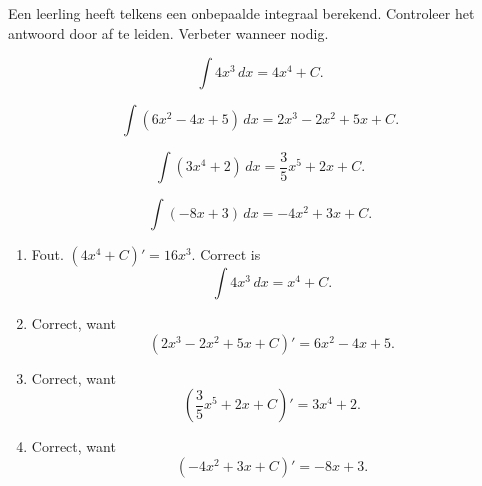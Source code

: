 \documentclass{ximera}
\begin{document}
\begin{oefening}{\oefB\ESS}

Een leerling heeft telkens een onbepaalde integraal berekend. Controleer het antwoord door af te leiden. Verbeter wanneer nodig.

\begin{question}
\[
\int 4x^3\,dx=4x^4+C.
\]
\end{question}

\begin{question}
\[
\int (6x^2-4x+5)\,dx=2x^3-2x^2+5x+C.
\]
\end{question}

\begin{question}
\[
\int (3x^4+2)\,dx=\frac35x^5+2x+C.
\]
\end{question}

\begin{question}
\[
\int (-8x+3)\,dx=-4x^2+3x+C.
\]
\end{question}

\begin{oplossing}

\begin{enumerate}
\item Fout. $(4x^4+C)'=16x^3$. Correct is
\[
\boxed{\int 4x^3\,dx=x^4+C}.
\]

\item Correct, want
\[
(2x^3-2x^2+5x+C)'=6x^2-4x+5.
\]

\item Correct, want
\[
\left(\frac35x^5+2x+C\right)'=3x^4+2.
\]

\item Correct, want
\[
(-4x^2+3x+C)'=-8x+3.
\]
\end{enumerate}

\end{oplossing}

\end{oefening}


\end{document}
